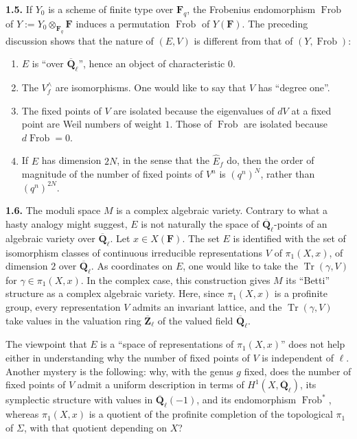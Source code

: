 \documentclass[11pt]{article}
\newcommand{\Fq}{\mathbf{F}_q}
\newcommand{\F}{\mathbf{F}}
\newcommand{\Qbl}{\overline{\mathbf{Q}}_{\ell}}
\newcommand{\Zbl}{\overline{\mathbf{Z}}_{\ell}}
\newcommand{\Frob}{\operatorname{Frob}}
\newcommand{\Tr}{\operatorname{Tr}}
\newcommand{\para}[1]{\medskip\noindent\textbf{#1}\enspace}
\begin{document}
\para{1.5.} If \(Y_0\) is a scheme of finite type over \(\Fq\), the Frobenius endomorphism \(\Frob\) of \(Y:=Y_0\otimes_{\Fq}\F\) induces a permutation \(\Frob\) of \(Y(\F)\). The preceding discussion shows that the nature of \((E,V)\) is different from that of \((Y,\Frob)\):
\begin{enumerate}[label=(\roman*),leftmargin=2.2em]
\item \(E\) is ``over \(\Qbl\)'', hence an object of characteristic \(0\).
\item The \(V_f^{\wedge}\) are isomorphisms. One would like to say that \(V\) has ``degree one''.
\item The fixed points of \(V\) are isolated because the eigenvalues of \(dV\) at a fixed point are Weil numbers of weight \(1\). Those of \(\Frob\) are isolated because \(d\Frob=0\).
\item If \(E\) has dimension \(2N\), in the sense that the \(\widehat{E}_f\) do, then the order of magnitude of the number of fixed points of \(V^n\) is \((q^n)^N\), rather than \((q^n)^{2N}\).
\end{enumerate}

\para{1.6.} The moduli space \(M\) is a complex algebraic variety. Contrary to what a hasty analogy might suggest, \(E\) is not naturally the space of \(\Qbl\)-points of an algebraic variety over \(\Qbl\). Let \(x\in X(\F)\). The set \(E\) is identified with the set of isomorphism classes of continuous irreducible representations \(V\) of \(\pi_1(X,x)\), of dimension \(2\) over \(\Qbl\). As coordinates on \(E\), one would like to take the \(\Tr(\gamma,V)\) for \(\gamma\in\pi_1(X,x)\). In the complex case, this construction gives \(M\) its ``Betti'' structure as a complex algebraic variety. Here, since \(\pi_1(X,x)\) is a profinite group, every representation \(V\) admits an invariant lattice, and the \(\Tr(\gamma,V)\) take values in the valuation ring \(\Zbl\) of the valued field \(\Qbl\).

The viewpoint that \(E\) is a ``space of representations of \(\pi_1(X,x)\)'' does not help either in understanding why the number of fixed points of \(V\) is independent of \(\ell\). Another mystery is the following: why, with the genus \(g\) fixed, does the number of fixed points of \(V\) admit a uniform description in terms of \(H^1(X,\Qbl)\), its symplectic structure with values in \(\Qbl(-1)\), and its endomorphism \(\Frob^*\), whereas \(\pi_1(X,x)\) is a quotient of the profinite completion of the topological \(\pi_1\) of \(\Sigma\), with that quotient depending on \(X\)?
\end{document}
